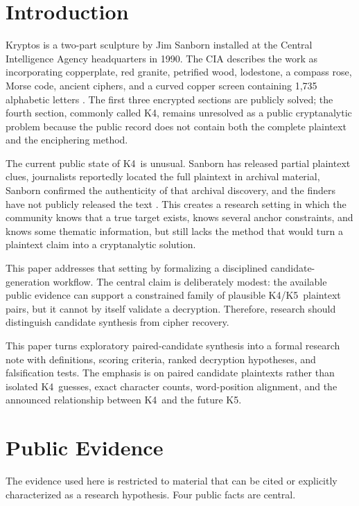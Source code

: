 \documentclass[12pt]{paperFormatting}
\newcommand{\Kfour}{K4}
\newcommand{\Kfive}{K5}
\begin{document}
\begin{thesisbody}

\section{Introduction}
Kryptos is a two-part sculpture by Jim Sanborn installed at the Central Intelligence Agency headquarters in 1990. The CIA describes the work as incorporating copperplate, red granite, petrified wood, lodestone, a compass rose, Morse code, ancient ciphers, and a curved copper screen containing 1,735 alphabetic letters \cite{ciaKryptosSculpture}. The first three encrypted sections are publicly solved; the fourth section, commonly called \Kfour, remains unresolved as a public cryptanalytic problem because the public record does not contain both the complete plaintext and the enciphering method.

The current public state of \Kfour\ is unusual. Sanborn has released partial plaintext clues, journalists reportedly located the full plaintext in archival material, Sanborn confirmed the authenticity of that archival discovery, and the finders have not publicly released the text \cite{basilioKryptosSolution2025,caseyAP2025}. This creates a research setting in which the community knows that a true target exists, knows several anchor constraints, and knows some thematic information, but still lacks the method that would turn a plaintext claim into a cryptanalytic solution.

This paper addresses that setting by formalizing a disciplined candidate-generation workflow. The central claim is deliberately modest: the available public evidence can support a constrained family of plausible \Kfour/\Kfive\ plaintext pairs, but it cannot by itself validate a decryption. Therefore, research should distinguish candidate synthesis from cipher recovery.

This paper turns exploratory paired-candidate synthesis into a formal research note with definitions, scoring criteria, ranked decryption hypotheses, and falsification tests. The emphasis is on paired candidate plaintexts rather than isolated \Kfour\ guesses, exact character counts, word-position alignment, and the announced relationship between \Kfour\ and the future \Kfive.

\section{Public Evidence}
The evidence used here is restricted to material that can be cited or explicitly characterized as a research hypothesis. Four public facts are central.


\end{thesisbody}
\end{document}
